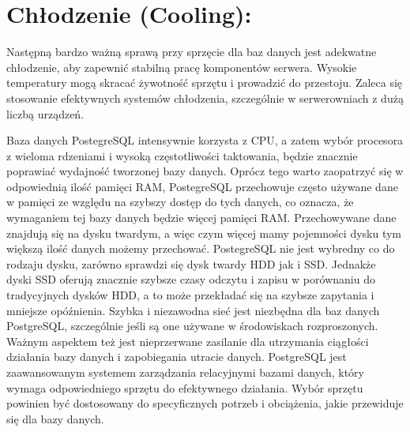 \documentclass[letterpaper,10pt,polish]{sphinxmanual}
\begin{document}
\section{Chłodzenie (Cooling):}
\label{\detokenize{DB-Report/Bazy Danych Rozdzia_u0142 1/Pod_rozdzia_u0142_1:chlodzenie-cooling}}
\sphinxAtStartPar
Następną bardzo ważną sprawą przy sprzęcie dla baz danych jest adekwatne chłodzenie, aby zapewnić stabilną pracę komponentów serwera. Wysokie temperatury mogą skracać żywotność sprzętu i prowadzić do przestoju. Zaleca się stosowanie efektywnych systemów chłodzenia, szczególnie w serwerowniach z dużą liczbą urządzeń.

\sphinxAtStartPar
Baza danych PostegreSQL intensywnie korzysta z CPU, a zatem wybór procesora z wieloma rdzeniami i wysoką częstotliwości taktowania, będzie znacznie poprawiać wydajność tworzonej bazy danych. Oprócz tego warto zaopatrzyć się w odpowiednią ilość pamięci RAM, PostegreSQL przechowuje często używane dane w pamięci  ze względu na szybszy dostęp do tych danych, co oznacza, że wymaganiem tej bazy danych będzie więcej pamięci RAM.  Przechowywane dane znajdują się na dysku twardym, a więc czym więcej mamy pojemności dysku tym większą ilość danych możemy przechować. PostegreSQL nie jest wybredny co do rodzaju dysku, zarówno sprawdzi się dysk twardy HDD jak i SSD. Jednakże dyski SSD oferują znacznie szybsze czasy odczytu i zapisu w porównaniu do tradycyjnych dysków HDD, a to może przekładać się na szybsze zapytania i mniejsze opóźnienia.  Szybka i niezawodna sieć jest niezbędna dla baz danych PostgreSQL, szczególnie jeśli są one używane w środowiskach rozproszonych. Ważnym aspektem też jest nieprzerwane zasilanie dla utrzymania ciągłości działania bazy danych i zapobiegania utracie danych. PostgreSQL jest zaawansowanym systemem zarządzania relacyjnymi bazami danych, który wymaga odpowiedniego sprzętu do efektywnego działania. Wybór sprzętu powinien być dostosowany do specyficznych potrzeb i obciążenia, jakie przewiduje się dla bazy danych.

\sphinxstepscope
\end{document}
